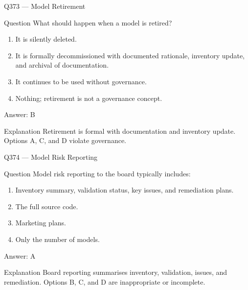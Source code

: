 \documentclass[aspectratio=169,8pt]{beamer}
\begin{document}
	\begin{frame}{Q373 --- Model Retirement}
		\begin{block}{Question}
			What should happen when a model is retired?
			\begin{enumerate}
				\item It is silently deleted.
				\item It is formally decommissioned with documented rationale, inventory update, and archival of documentation.
				\item It continues to be used without governance.
				\item Nothing; retirement is not a governance concept.
			\end{enumerate}
		\end{block}
		\begin{exampleblock}{Answer: B}\end{exampleblock}
		\begin{block}{Explanation}
			Retirement is formal with documentation and inventory update. Options A, C, and D violate governance.
		\end{block}
	\end{frame}
	
	\begin{frame}{Q374 --- Model Risk Reporting}
		\begin{block}{Question}
			Model risk reporting to the board typically includes:
			\begin{enumerate}
				\item Inventory summary, validation status, key issues, and remediation plans.
				\item The full source code.
				\item Marketing plans.
				\item Only the number of models.
			\end{enumerate}
		\end{block}
		\begin{exampleblock}{Answer: A}\end{exampleblock}
		\begin{block}{Explanation}
			Board reporting summarises inventory, validation, issues, and remediation. Options B, C, and D are inappropriate or incomplete.
		\end{block}
	\end{frame}
	
\end{document}
